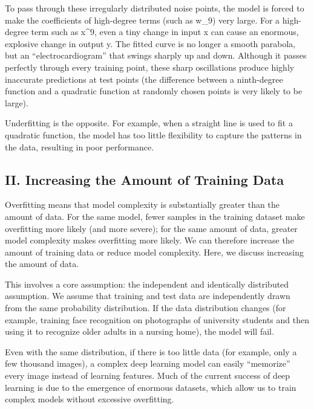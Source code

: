 To pass through these irregularly distributed noise points, the model is forced to make the coefficients of high-degree terms (such as w\_9) very large. For a high-degree term such as x\^{}9, even a tiny change in input x can cause an enormous, explosive change in output y. The fitted curve is no longer a smooth parabola, but an ``electrocardiogram'' that swings sharply up and down. Although it passes perfectly through every training point, these sharp oscillations produce highly inaccurate predictions at test points (the difference between a ninth-degree function and a quadratic function at randomly chosen points is very likely to be large).

Underfitting is the opposite. For example, when a straight line is used to fit a quadratic function, the model has too little flexibility to capture the patterns in the data, resulting in poor performance.

\hypertarget{ii.-increasing-the-amount-of-training-data}{%
\subsection{II. Increasing the Amount of Training Data}\label{ii.-increasing-the-amount-of-training-data}}

Overfitting means that model complexity is substantially greater than the amount of data. For the same model, fewer samples in the training dataset make overfitting more likely (and more severe); for the same amount of data, greater model complexity makes overfitting more likely. We can therefore increase the amount of training data or reduce model complexity. Here, we discuss increasing the amount of data.

This involves a core assumption: the independent and identically distributed assumption. We assume that training and test data are independently drawn from the same probability distribution. If the data distribution changes (for example, training face recognition on photographs of university students and then using it to recognize older adults in a nursing home), the model will fail.

Even with the same distribution, if there is too little data (for example, only a few thousand images), a complex deep learning model can easily ``memorize'' every image instead of learning features. Much of the current success of deep learning is due to the emergence of enormous datasets, which allow us to train complex models without excessive overfitting.

